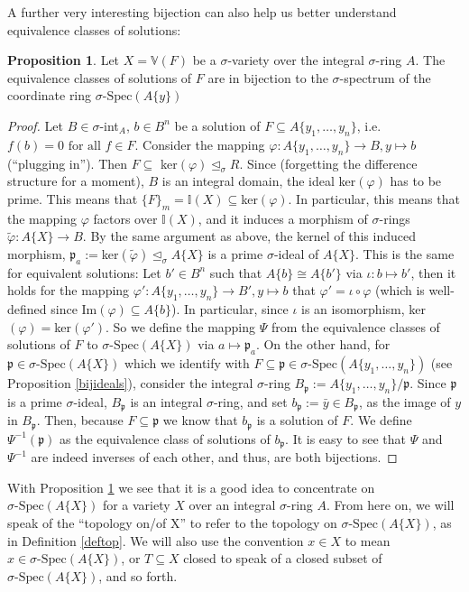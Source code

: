 \documentclass{article}
\def\I{\mathbb{I}}
\def\VV{\mathbb{V}}
\def\p{\mathfrak{p}}
\def\s{\sigma}
\def\si{\unlhd_{\sigma}}
\def\sSpec{\sigma\text{-Spec}}
\def\fa{\text{ for all }}
\newenvironment{bew}{\begin{proof}[Proof]}{\end{proof}}
\theoremstyle{definition}
\newtheorem{prop}[Satz]{Proposition}
\begin{document}
A further very interesting bijection can also help us better understand equivalence classes of solutions: 
\begin{prop}\label{bijsols}
Let $X = \VV(F)$ be a $\s$-variety over the integral $\s$-ring $A$. The equivalence classes of solutions of $F$ are in bijection to the $\s$-spectrum of the coordinate ring $\sSpec(A\{y\})$
\begin{bew}
Let $B \in \s$-int$_A$, $b \in B^n$ be a solution of $F \subseteq A\{y_1,\ldots,y_n\}$, i.e. $f(b) = 0 \fa f \in F$. Consider the mapping $\varphi: A\{y_1,\ldots,y_n\} \rightarrow B, y \mapsto b$ (``plugging in''). Then $F \subseteq $ ker$( \varphi) \si R$.
Since (forgetting the difference structure for a moment), $B$ is an integral domain, the ideal ker$(\varphi)$ has to be prime. This means that $\{F\}_m = \I(X) \subseteq $ker$(\varphi)$. 
In particular, this means that the mapping $\varphi$ factors over $\I(X)$, and it induces a morphism of $\s$-rings $\tilde \varphi: A\{X\} \rightarrow B$. By the same argument as above, the kernel of this induced
morphism, $\p_a := $ker$(\tilde \varphi) \si A\{X\}$ is a prime $\s$-ideal of $A\{X\}$. This is the same for equivalent solutions: Let $b' \in B^n$ such that $A\{b\} \cong A\{b'\}$ via $\iota: b \mapsto b'$, 
then it holds for the mapping $\varphi': A\{y_1, \ldots, y_n\} \rightarrow B', y \mapsto b$ that $\varphi' = \iota \circ \varphi$ (which is well-defined since Im$(\varphi)\subseteq A\{b\}$). In particular, since $\iota$ is an isomorphism, ker$(\varphi) = $ker$(\varphi')$.
So we define the mapping $\Psi$ from the equivalence classes of solutions of $F$ to $\sSpec(A\{X\})$ via $a \mapsto \p_a$. On the other hand, for $\p \in \sSpec(A\{X\})$ which we identify with $F \subseteq \p \in \sSpec(A\{y_1,\ldots,y_n\})$ (see Proposition \ref{bijideals}), consider the integral $\s$-ring $B_\p:= A\{y_1,\ldots,y_n\}/\p$.
Since $\p$ is a prime $\s$-ideal, $B_\p$ is an integral $\s$-ring, and set $b_\p := \bar y \in B_\p$, as the image of $y$ in $B_\p$. Then, because $F \subseteq \p$ we know that $b_\p$ is a solution of $F$. 
We define $\Psi^{-1}(\p)$ as the equivalence class of solutions of $b_\p$. It is easy to see that $\Psi$ and $\Psi^{-1}$ are indeed inverses of each other, and thus, are both bijections.
\end{bew}
\end{prop}

With Proposition \ref{bijsols} we see that it is a good idea to concentrate on $\sSpec(A\{X\})$ for a variety $X$ over an integral $\s$-ring $A$.
 From here on, we will speak of the ``topology on/of X'' to refer to the topology on $\sSpec(A\{X\})$, as in Definition \ref{deftop}. 
We will also use the convention $x \in X$ to mean $x \in \sSpec(A\{X\})$, or $T \subseteq X$ closed to speak of a closed subset of $\sSpec(A\{X\})$, and so forth.
\end{document}
